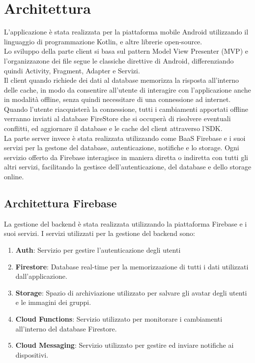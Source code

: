 \chapter{Architettura}                %
\lhead[\fancyplain{}{\bfseries\thepage}]{\fancyplain{}{\bfseries\rightmark}}


L'applicazione è stata realizzata per la piattaforma mobile Android utilizzando il linguaggio di programmazione Kotlin, e altre librerie open-source.\\
Lo sviluppo della parte client si basa sul pattern Model View Presenter (MVP) e l'organizzazone dei file segue le classiche direttive di Android, differenziando quindi Activity, Fragment, Adapter e Servizi.\\
Il client quando richiede dei dati al database memorizza la risposta all'interno delle cache, in modo da consentire all'utente di interagire con l'applicazione anche in modalità offline, senza quindi necessitare di una connessione ad internet. Quando l'utente riacquisterà la connessione, tutti i cambiamenti apportati offline verranno inviati al database FireStore che si occuperà di risolvere eventuali conflitti, ed aggiornare il database e le cache del client attraverso l'SDK.\\
La parte server invece è stata realizzata utilizzando come BaaS Firebase e i suoi servizi per la gestone del database, autenticazione, notifiche e lo storage. Ogni servizio offerto da Firebase interagisce in maniera diretta o indiretta con tutti gli altri servizi, facilitando la gestisce dell'autenticazione, del database e dello storage online.\\


\newpage



\section{Architettura Firebase}                 %
La gestione del backend è stata realizzata utilizzando la piattaforma Firebase e i suoi servizi.
I servizi utilizzati per la gestione del backend sono:
\begin{enumerate}
\item \textbf{Auth}: Servizio per gestire l'autenticazione degli utenti
\item \textbf{Firestore}: Database real-time per la memorizzazione di tutti i dati utilizzati dall'applicazione.
\item \textbf{Storage}: Spazio di archiviazione utilizzato per salvare gli avatar degli utenti e le immagini dei gruppi.
\item \textbf{Cloud Functions}: Servizio utilizzato per monitorare i cambiamenti all'interno del database Firestore.
\item \textbf{Cloud Messaging}: Servizio utilizzato per gestire ed inviare notifiche ai dispositivi.
\end{enumerate}


